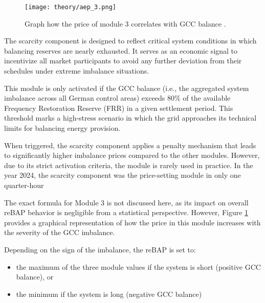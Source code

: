 \documentclass[class=scrbook, crop=false]{standalone}
\begin{document}


 \begin{figure}[ht]
            \centering
            \texttt{[image: theory/aep\_3.png]}
             \caption[Graph how the price of module 3 correlates with GCC balance]{Graph how the price of module 3 correlates with GCC balance .}
            \label{fig::aep_3}
 \end{figure}

The scarcity component is designed to reflect critical system conditions in which balancing reserves are nearly exhausted. It serves as an economic signal to incentivize all market participants to avoid any further deviation from their schedules under extreme imbalance situations.

This module is only activated if the GCC balance (i.e., the aggregated system imbalance across all German control areas) exceeds 80\% of the available Frequency Restoration Reserve (FRR) in a given settlement period. This threshold marks a high-stress scenario in which the grid approaches its technical limits for balancing energy provision.

When triggered, the scarcity component applies a penalty mechanism that leads to significantly higher imbalance prices compared to the other modules. However, due to its strict activation criteria, the module is rarely used in practice. In the year 2024, the scarcity component was the price-setting module in only one quarter-hour 

The exact formula for Module 3 is not discussed here, as its impact on overall reBAP behavior is negligible from a statistical perspective. However, Figure \ref{fig::aep_3} provides a graphical representation of how the price in this module increases with the severity of the GCC imbalance.

Depending on the sign of the imbalance, the reBAP is set to:
\begin{itemize}
\item the maximum of the three module values if the system is short (positive GCC balance), or
\item the minimum if the system is long (negative GCC balance)
\end{itemize}
\end{document}
